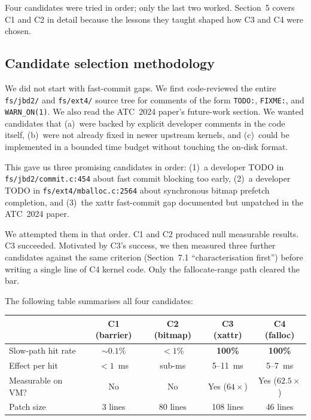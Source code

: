 \documentclass[12pt,a4paper]{article}
\begin{document}
Four candidates were tried in order; only the last two worked.
Section~5 covers C1 and C2 in detail because the lessons they
taught shaped how C3 and C4 were chosen.

\subsection{Candidate selection methodology}

We did not start with fast-commit gaps.  We first code-reviewed the
entire \texttt{fs/jbd2/} and \texttt{fs/ext4/} source tree for comments
of the form \texttt{TODO:}, \texttt{FIXME:}, and \texttt{WARN\_ON(1)}.
We also read the ATC~2024 paper's future-work section.  We wanted
candidates that (a)~were backed by explicit developer comments in the
code itself, (b)~were not already fixed in newer upstream kernels,
and (c)~could be implemented in a bounded time budget without touching
the on-disk format.

This gave us three promising candidates in order: (1)~a developer TODO
in \texttt{fs/jbd2/commit.c:454} about fast commit blocking too early,
(2)~a developer TODO in \texttt{fs/ext4/mballoc.c:2564} about
synchronous bitmap prefetch completion, and (3)~the xattr fast-commit
gap documented but unpatched in the ATC~2024 paper.

We attempted them in that order.  C1 and C2 produced null measurable
results.  C3 succeeded.  Motivated by C3's success, we then measured
three further candidates against the same criterion (Section~7.1
``characterisation first'') before writing a single line of C4 kernel
code.  Only the fallocate-range path cleared the bar.

The following table summarises all four candidates:

\begin{center}
\small
\begin{tabular}{lcccc}
\toprule
 & \textbf{C1 (barrier)} & \textbf{C2 (bitmap)} & \textbf{C3 (xattr)} & \textbf{C4 (falloc)} \\
\midrule
Slow-path hit rate   & ${\sim}0.1\%$ & ${<}1\%$  & \textbf{100\%}   & \textbf{100\%}  \\
Effect per hit       & ${<}1$~ms     & sub-ms    & 5--11~ms          & 5--7~ms         \\
Measurable on VM?    & No            & No        & Yes ($64{\times}$) & Yes ($62.5{\times}$) \\
Patch size           & 3 lines       & 80 lines  & 108 lines         & 46 lines        \\
\bottomrule
\end{tabular}
\end{center}
\end{document}
